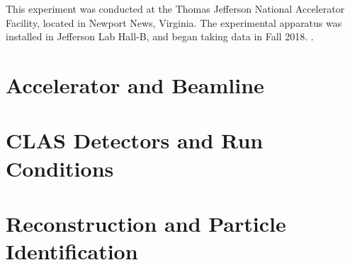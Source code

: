 This experiment was conducted at the Thomas Jefferson National Accelerator Facility, located in Newport News, Virginia. The experimental apparatus was installed in Jefferson Lab Hall-B, and began taking data in Fall 2018. .

\section{Accelerator and Beamline}
                  


\section{CLAS Detectors and Run Conditions}\label{sec:clas12exp}
    


\section{Reconstruction and Particle Identification}
    







